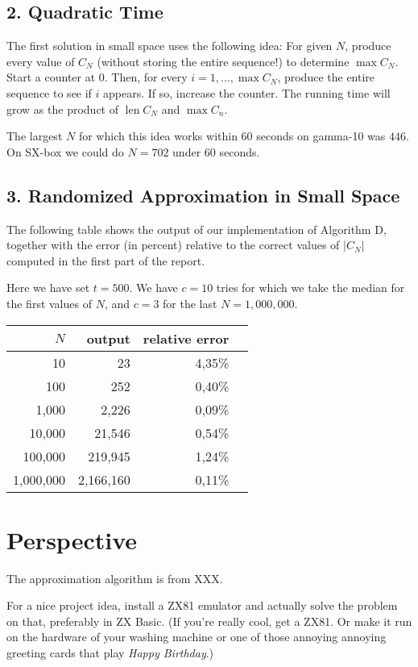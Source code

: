 \documentclass{tufte-handout}
\begin{document}
\subsection{2. Quadratic Time}

The first solution in small space uses the following idea: For given
$N$, produce every value of $C_N$ (without storing the entire
sequence!)
to determine $\max C_N$.
Start a counter at 0.
Then, for every $i=1,\ldots, \max C_N$, produce the entire sequence to
see if $i$ appears.
If so, increase the counter.
The running time will grow as the product of $\operatorname{len}C_N$ and $ \max C_n$.

The largest $N$ for which this idea works within 60 seconds on gamma-10 was $446$. On SX-box we could do $N = 702$ under 60 seconds.


\subsection{3. Randomized Approximation in Small Space}

The following table shows the output of our implementation of
Algorithm D, together with the error (in percent) relative to the
correct values of $|C_N|$ computed in the first part of the report.

Here we have set $t = 500$. We have $c = 10$ tries for which we take the median for the first values of $N$, and $c = 3$ for the last $N = 1,000,000$.

\medskip
\begin{tabular}{rrrr}
  \toprule
  $N$ & output & relative error \\
  \midrule
  10 & 23 & 4,35\% \\
  100 & 252 & 0,40\% \\
  1,000 & 2,226 & 0,09\% \\
  10,000 & 21,546 & 0,54\% \\
  100,000 & 219,945 & 1,24\% \\
  1,000,000 & 2,166,160 & 0,11\% \\
  \bottomrule
\end{tabular}


\newpage
\section{Perspective}

The approximation algorithm is from XXX.

For a nice project idea, install a ZX81 emulator and actually solve
the problem on that, preferably in ZX Basic.
(If you're really cool, get a ZX81.
Or make it run on the hardware of your washing machine or one of those
annoying annoying greeting cards that play \emph{Happy Birthday}.)
\end{document}
